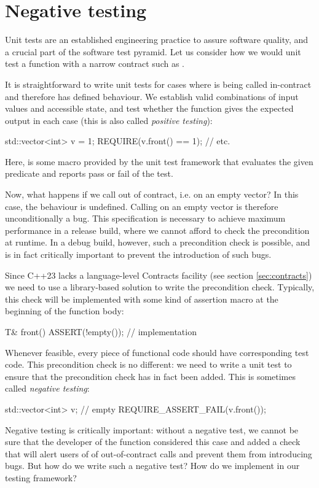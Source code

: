 \section{Negative testing}
\label{sec:negativetest}

Unit tests are an established engineering practice to assure software quality, and a crucial part of the software test pyramid. Let us consider how we would unit test a function with a narrow contract such as .

It is straightforward to write unit tests for cases where  is being called in-contract and therefore has defined behaviour. We establish valid combinations of input values and accessible state, and test whether the function gives the expected output in each case (this is also called \emph{positive testing}):
\begin{codeblock}
std::vector<int> v = {1};
REQUIRE(v.front() == 1);
// etc.
\end{codeblock}
Here,  is some macro provided by the unit test framework that evaluates the given predicate and reports pass or fail of the test.

Now, what happens if we call  out of contract, i.e. on an empty vector? In this case, the behaviour is undefined. Calling  on an empty vector is therefore unconditionally a bug. This specification is necessary to achieve maximum performance in a release build, where we cannot afford to check the precondition at runtime. In a debug build, however, such a precondition check is possible, and is in fact critically important to prevent the introduction of such bugs.

Since C++23 lacks a language-level Contracts facility (see section \ref{sec:contracts}) we need to use a library-based solution to write the precondition check. Typically, this check will be implemented with some kind of assertion macro at the beginning of the function body:
\begin{codeblock}
T& front() {
  ASSERT(!empty());
  // implementation
}
\end{codeblock}


Whenever feasible, every piece of functional code should have corresponding test code. This precondition check is no different: we need to write a unit test to ensure that the precondition check has in fact been added. This is sometimes called \emph{negative testing}:
\begin{codeblock}
std::vector<int> v;  // empty
REQUIRE_ASSERT_FAIL(v.front());
\end{codeblock}
Negative testing is critically important: without a negative test, we cannot be sure that the developer of the  function considered this case and added a check that will alert users of  of out-of-contract calls and prevent them from introducing bugs.
But how do we write such a negative test? How do we implement  in our testing framework?

